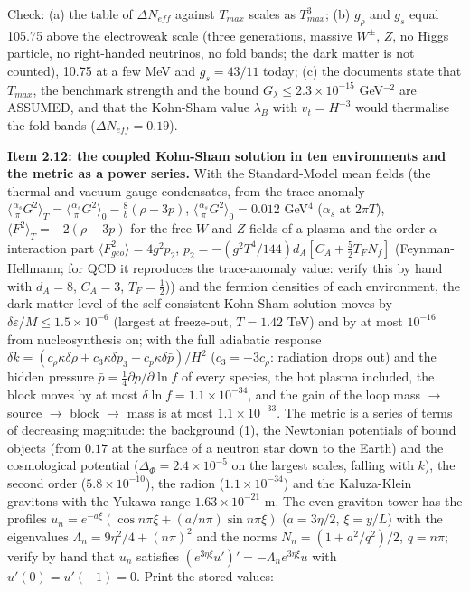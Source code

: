 \documentclass[
  10pt,
]{article}
\begin{document}
Check: (a) the table of \(\Delta N_{eff}\) against \(T_{max}\) scales as
\(T_{max}^3\); (b) \(g_\rho\) and \(g_s\) equal 105.75 above the
electroweak scale (three generations, massive \(W^\pm\), \(Z\), no Higgs
particle, no right-handed neutrinos, no fold bands; the dark matter is
not counted), 10.75 at a few MeV and \(g_s = 43/11\) today; (c) the
documents state that \(T_{max}\), the benchmark strength and the bound
\(G_\lambda \le 2.3\times10^{-15}\) GeV\(^{-2}\) are ASSUMED, and that
the Kohn-Sham value \(\lambda_B\) with \(v_t = H^{-3}\) would thermalise
the fold bands (\(\Delta N_{eff} = 0.19\)).

\textbf{Item 2.12: the coupled Kohn-Sham solution in ten environments
and the metric as a power series.} With the Standard-Model mean fields
(the thermal and vacuum gauge condensates, from the trace anomaly
\(\langle\tfrac{\alpha_s}{\pi}G^2\rangle_T = \langle\tfrac{\alpha_s}{\pi}G^2\rangle_0 - \tfrac{8}{b}(\rho - 3p)\),
\(\langle\tfrac{\alpha_s}{\pi}G^2\rangle_0 = 0.012\) GeV\(^4\)
(\(\alpha_s\) at \(2\pi T\)), \(\langle F^2\rangle_T = -2(\rho - 3p)\)
for the free \(W\) and \(Z\) fields of a plasma and the order-\(\alpha\)
interaction part \(\langle F_{geo}^2\rangle = 4g^2p_2\),
\(p_2 = -(g^2T^4/144)d_A[C_A + \frac52T_FN_f]\) (Feynman-Hellmann; for
QCD it reproduces the trace-anomaly value: verify this by hand with
\(d_A = 8\), \(C_A = 3\), \(T_F = \frac12\))) and the fermion densities
of each environment, the dark-matter level of the self-consistent
Kohn-Sham solution moves by \(\delta\varepsilon/M \le 1.5\times10^{-6}\)
(largest at freeze-out, \(T = 1.42\) TeV) and by at most \(10^{-16}\)
from nucleosynthesis on; with the full adiabatic response
\(\delta k = (c_\rho\kappa\delta\rho + c_3\kappa\delta p_3 + c_p\kappa\delta\bar p)/H^2\)
(\(c_3 = -3c_\rho\): radiation drops out) and the hidden pressure
\(\bar p = \frac14\partial p/\partial\ln f\) of every species, the hot
plasma included, the block moves by at most
\(\delta\ln f = 1.1\times10^{-34}\), and the gain of the loop mass
\(\to\) source \(\to\) block \(\to\) mass is at most
\(1.1\times10^{-33}\). The metric is a series of terms of decreasing
magnitude: the background (1), the Newtonian potentials of bound objects
(from \(0.17\) at the surface of a neutron star down to the Earth) and
the cosmological potential (\(\Delta_\Phi = 2.4\times10^{-5}\) on the
largest scales, falling with \(k\)), the second order
(\(5.8\times10^{-10}\)), the radion (\(1.1\times10^{-34}\)) and the
Kaluza-Klein gravitons with the Yukawa range \(1.63\times10^{-21}\) m.
The even graviton tower has the profiles
\(u_n = e^{-a\xi}(\cos n\pi\xi + (a/n\pi)\sin n\pi\xi)\)
(\(a = 3\eta/2\), \(\xi = y/L\)) with the eigenvalues
\(\Lambda_n = 9\eta^2/4 + (n\pi)^2\) and the norms
\(N_n = (1 + a^2/q^2)/2\), \(q = n\pi\); verify by hand that \(u_n\)
satisfies \((e^{3\eta\xi}u')' = -\Lambda_ne^{3\eta\xi}u\) with
\(u'(0) = u'(-1) = 0\). Print the stored values:
\end{document}
